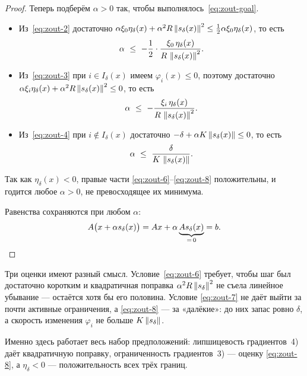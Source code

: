\begin{proof}
Теперь подберём $\alpha > 0$ так, чтобы выполнялось~\eqref{eq:zout-goal}.
\begin{itemize}[left=0pt]
  \item Из~\eqref{eq:zout-2} достаточно
        $\alpha\xi_0\eta_\delta(x) + \alpha^2 R\left\lVert s_\delta(x) \right\rVert^2
         \le \tfrac12 \alpha \xi_0 \eta_\delta(x)$, то есть
        \begin{equation}\label{eq:zout-6}
          \alpha \ \le\ -\frac{1}{2}\cdot
          \frac{\xi_0\,\eta_\delta(x)}{R\,\left\lVert s_\delta(x) \right\rVert^2} .
        \end{equation}
  \item Из~\eqref{eq:zout-3} при $i \in I_\delta(x)$ имеем $\varphi_i(x) \le 0$,
        поэтому достаточно
        $\alpha\xi_i\eta_\delta(x) + \alpha^2 R\left\lVert s_\delta(x) \right\rVert^2 \le 0$, то есть
        \begin{equation}\label{eq:zout-7}
          \alpha \ \le\ -\frac{\xi_i\,\eta_\delta(x)}{R\,\norm{s_\delta(x)}^2} .
        \end{equation}
  \item Из~\eqref{eq:zout-4} при $i \notin I_\delta(x)$ достаточно
        $-\delta + \alpha K \left\lVert s_\delta(x) \right\rVert \le 0$, то есть
        \begin{equation}\label{eq:zout-8}
          \alpha \ \le\ \frac{\delta}{K\,\left\lVert s_\delta(x) \right\rVert} .
        \end{equation}
\end{itemize}
Так как $\eta_\delta(x) < 0$, правые части
\eqref{eq:zout-6}--\eqref{eq:zout-8} положительны, и годится любое
$\alpha > 0$, не превосходящее их минимума.

Равенства сохраняются при любом $\alpha$:
\[
  A\big(x + \alpha s_\delta(x)\big)
  = Ax + \alpha \underbrace{A s_\delta(x)}_{=\,0} = b .
  \qedhere
\]
\end{proof}

\begin{idea}
Три оценки имеют разный смысл. Условие~\eqref{eq:zout-6} требует, чтобы шаг был
достаточно коротким и квадратичная поправка $\alpha^2 R\left\lVert s_\delta \right\rVert^2$ не
съела линейное убывание — остаётся хотя бы его половина. Условие
\eqref{eq:zout-7} не даёт выйти за почти активные ограничения, а
\eqref{eq:zout-8} — за «далёкие»: до них запас ровно $\delta$, а скорость
изменения $\varphi_i$ не больше $K\left\lVert s_\delta \right\rVert$.

Именно здесь работает весь набор предположений: липшицевость градиентов~4) даёт
квадратичную поправку, ограниченность градиентов~3) — оценку
\eqref{eq:zout-8}, а $\eta_\delta < 0$ — положительность всех трёх границ.
\end{idea}

